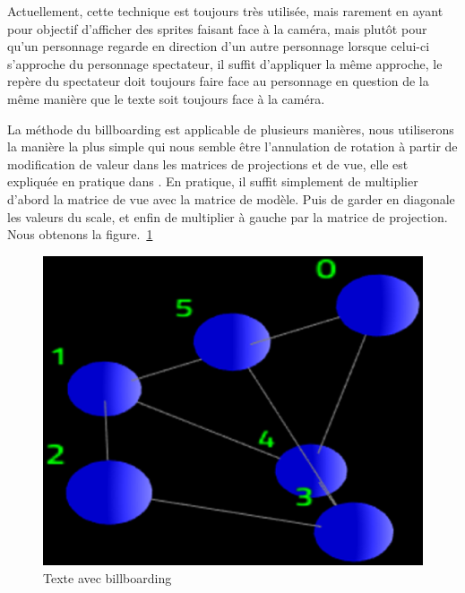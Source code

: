\documentclass[a4paper, 11pt]{article}
\begin{document}
Actuellement, cette technique est toujours très utilisée, mais rarement en ayant pour objectif d'afficher des sprites faisant face à la caméra, mais plutôt pour qu'un personnage regarde en direction d'un autre personnage lorsque celui-ci s'approche du personnage spectateur, il suffit d'appliquer la même approche, le repère du spectateur doit toujours faire face au personnage en question de la même manière que le texte soit toujours face à la caméra.

La méthode du billboarding est applicable de plusieurs manières, nous utiliserons la manière la plus simple qui nous semble être l'annulation de rotation à partir de modification de valeur dans les matrices de projections et de vue, elle est expliquée en pratique dans \cite{billboard}. En pratique, il suffit simplement de multiplier d'abord la matrice de vue avec la matrice de modèle. Puis de garder en diagonale les valeurs du scale, et enfin de multiplier à gauche par la matrice de projection. Nous obtenons la figure.~\ref{fig:tnode_bb}

\begin{figure}[ht]
  \begin{center}
    \includegraphics[scale=0.4]{contents/tnode_bb}
  \end{center}
  \caption{Texte avec billboarding}
  \label{fig:tnode_bb}
\end{figure}

\newpage
\end{document}
